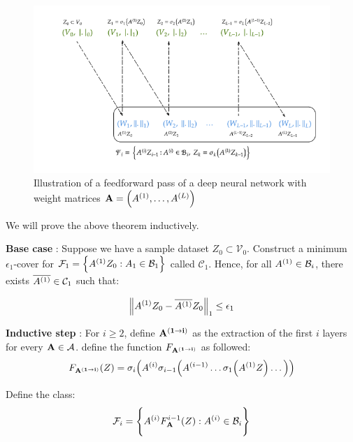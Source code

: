 \begin{proof*}
    \begin{figure}[!ht]
        \centering
        \includegraphics[width=\textwidth]{figures/neural-network.png}
        \caption{Illustration of a feedforward pass of a deep neural network with weight matrices ${\bf A}=\Big( A^{(1)}, \dots, A^{(L)} \Big)$}
        \label{fig:neural-network-illustration}
    \end{figure}

    \noindent We will prove the above theorem inductively. 
    
    \noindent\newline\textbf{Base case} : Suppose we have a sample dataset $Z_0\subset\mathcal{V}_0$. Construct a minimum $\epsilon_1$-cover for $\mathcal{F}_1 = \Big\{ A^{(1)}Z_0 : A_1 \in \mathcal{B}_1 \Big\}$ called $\mathcal{C}_1$. Hence, for all $A^{(1)}\in\mathcal{B}_i$, there exists $\overline{A^{(1)}}\in\mathcal{C}_1$ such that:

    \begin{align*}
        \Big\|A^{(1)}Z_0 - \overline{A^{(1)}}Z_0\Big\|_1 \le \epsilon_1
    \end{align*} 
    
    
    \noindent \textbf{Inductive step} : For $i\ge 2$, define ${\bf A^{(1\to i)}}$ as the extraction of the first $i$ layers for every ${\bf A}\in\mathcal{A}$. define the function $F_{\bf A^{(1\to i)}}$ as followed:
    \begin{align*}
        F_{\bf A^{(1\to i)}}(Z) = \sigma_i\Big( 
            A^{(i)}\sigma_{i-1}\Big( 
                A^{(i-1)}\dots\sigma_1\Big( A^{(1)}Z \Big)\dots
             \Big)
         \Big)
    \end{align*} 
    
    
    \noindent Define the class:
    \begin{align*}
        \mathcal{F}_i = \Bigg\{ 
            A^{(i)}F^{i-1}_{\bf A}(Z) : A^{(i)} \in \mathcal{B}_i        
         \Bigg\}
    \end{align*}



\end{proof*}
